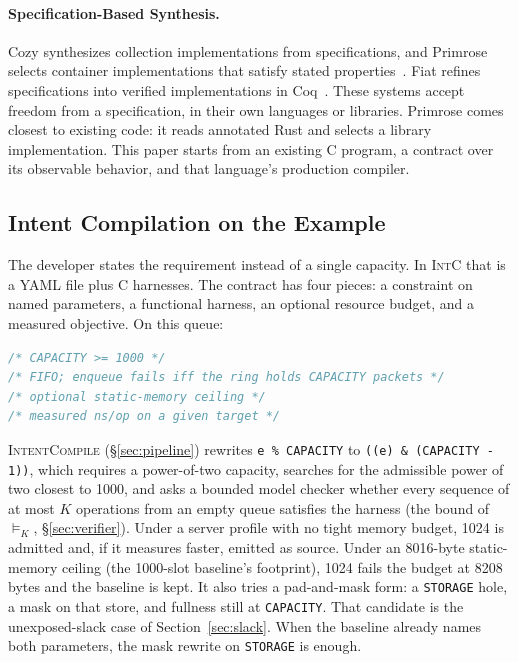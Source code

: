 \paragraph{Specification-Based Synthesis.}
Cozy synthesizes collection implementations from specifications, and Primrose
selects container implementations that satisfy stated
properties~\cite{loncaric2016cozy,Qin2023Primrose}. Fiat refines specifications
into verified implementations in Coq~\cite{delaware2015fiat}. These systems
accept freedom from a specification, in their own languages or libraries.
Primrose comes closest to existing code: it reads annotated Rust and selects a
library implementation. This paper starts from an existing C program, a
contract over its observable behavior, and that language's production compiler.

\subsection{Intent Compilation on the Example}
\label{sec:overview_intent}

The developer states the requirement instead of a single capacity. In
\textsc{IntC} that is a YAML file plus C harnesses. The contract has four pieces:
a constraint on named parameters, a functional harness, an optional resource
budget, and a measured objective. On this queue:

\begin{lstlisting}[language=C]
/* CAPACITY >= 1000 */
/* FIFO; enqueue fails iff the ring holds CAPACITY packets */
/* optional static-memory ceiling */
/* measured ns/op on a given target */
\end{lstlisting}

\textsc{IntentCompile} (\S\ref{sec:pipeline}) rewrites \texttt{e \% CAPACITY} to
\texttt{((e) \& (CAPACITY - 1))}, which requires a power-of-two capacity, searches
for the admissible power of two closest to 1000, and asks a bounded model
checker whether every sequence of at most \(K\) operations from an empty queue
satisfies the harness (the bound of \(\models_K\), \S\ref{sec:verifier}).
Under a server profile with no tight memory budget, 1024
is admitted and, if it measures faster, emitted as source. Under an 8016-byte
static-memory ceiling (the 1000-slot baseline's footprint), 1024 fails the
budget at 8208 bytes and the baseline is kept.
It also tries a pad-and-mask form: a \texttt{STORAGE} hole, a mask on that
store, and fullness still at \texttt{CAPACITY}. That candidate is the
unexposed-slack case of Section~\ref{sec:slack}. When the baseline already names
both parameters, the mask rewrite on \texttt{STORAGE} is enough.
